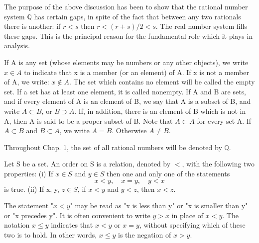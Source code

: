 \begin{remark} %
  \label{rem:chap1:gaps_in_Q}
  The purpose of the above discussion has been to show that the
  rational number system $\mathbb{Q}$ has certain gaps, in spite of
  the fact that between any two rationals there is another: if $r<s$
  then $r<(r+s)/2<s$. The real number system fills these gaps. This
  is the principal reason for the fundamental role which it plays in analysis.
\end{remark}

\begin{definition} %
  \label{def:chap1:set_notation}
  If A is any set (whose elements may be numbers or any other
  objects), we write $x \in A$ to indicate that x is a member (or an
  element) of A.
  If x is not a member of A, we write: $x \notin A$.
  The set which contains no element will be called the empty set. If
  a set has at least one element, it is called nonempty.
  If A and B are sets, and if every element of A is an element of B,
  we say that A is a subset of B, and write $A \subset B$, or $B
  \supset A$. If, in addition, there is an element of B which is not
  in A, then A is said to be a proper subset of B. Note that $A
  \subset A$ for every set A.
  If $A \subset B$ and $B \subset A$, we write $A=B$. Otherwise $A \ne B$.
\end{definition}

\begin{definition} %
  \label{def:chap1:Q_notation}
  Throughout Chap. 1, the set of all rational numbers will be denoted
  by $\mathbb{Q}$.
\end{definition}

\begin{definition} %
  \label{def:chap1:order_relation}
  Let S be a set. An order on S is a relation, denoted by $<$, with
  the following two properties:
  (i) If $x \in S$ and $y \in S$ then one and only one of the statements
  \[ x<y, \quad x=y, \quad y<x \]
  is true.
  (ii) If x, y, $z \in S$, if $x<y$ and $y<z$, then $x<z$.

  The statement "$x<y$" may be read as "x is less than y" or "x is
  smaller than y" or "x precedes y".
  It is often convenient to write $y>x$ in place of $x<y$.
  The notation $x \le y$ indicates that $x<y$ or $x=y$, without
  specifying which of these two is to hold. In other words, $x \le y$
  is the negation of $x>y$.
\end{definition}

